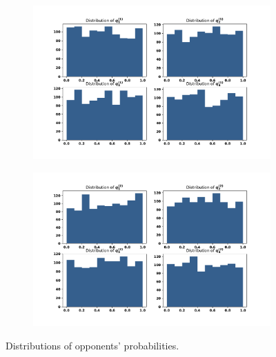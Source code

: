 \begin{figure}[!htbp]
    \begin{subfigure}{0.5\textwidth}
        \centering
        \includegraphics[width=\linewidth]{src/chapters/05/paper/memory-size-in-the-prisoners-dilemma/img/first_opponent_probabilities.pdf}
        \label{fig:first_opponents_probabilities}
    \end{subfigure}
    \begin{subfigure}{0.5\textwidth}
        \centering
        \includegraphics[width=\linewidth]{src/chapters/05/paper/memory-size-in-the-prisoners-dilemma/img/second_opponent_probabilities.pdf}
        \label{fig:second_opponents_probabilities}
    \end{subfigure}
    \caption{Distributions of opponents' probabilities.}
\end{figure}

